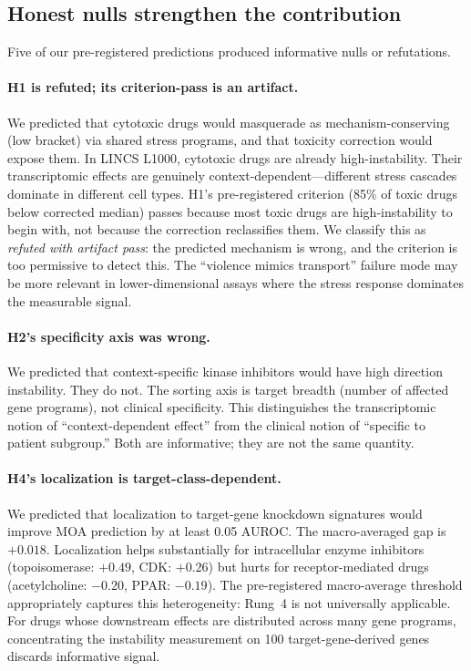 \documentclass{article}
\begin{document}
\subsection{Honest nulls strengthen the contribution}

Five of our pre-registered predictions produced informative nulls or refutations.

\paragraph{H1 is refuted; its criterion-pass is an artifact.}
We predicted that cytotoxic drugs would masquerade as mechanism-conserving
(low bracket) via shared stress programs, and that toxicity correction would
expose them. In LINCS L1000, cytotoxic drugs are already high-instability.
Their transcriptomic effects are genuinely context-dependent---different stress
cascades dominate in different cell types. H1's pre-registered criterion
(85\% of toxic drugs below corrected median) passes because most toxic drugs
are high-instability to begin with, not because the correction reclassifies
them. We classify this as \emph{refuted with artifact pass}: the predicted
mechanism is wrong, and the criterion is too permissive to detect this.
The ``violence mimics transport'' failure mode may be more relevant in
lower-dimensional assays where the stress response dominates the
measurable signal.

\paragraph{H2's specificity axis was wrong.}
We predicted that context-specific kinase inhibitors would have high direction
instability. They do not. The sorting axis is target breadth (number of
affected gene programs), not clinical specificity. This distinguishes the
transcriptomic notion of ``context-dependent effect'' from the clinical notion
of ``specific to patient subgroup.'' Both are informative; they are not the
same quantity.

\paragraph{H4's localization is target-class-dependent.}
We predicted that localization to target-gene knockdown signatures would
improve MOA prediction by at least 0.05 AUROC. The macro-averaged gap is
$+0.018$. Localization helps substantially for intracellular enzyme
inhibitors (topoisomerase: $+0.49$, CDK: $+0.26$) but hurts for
receptor-mediated drugs (acetylcholine: $-0.20$, PPAR: $-0.19$). The
pre-registered macro-average threshold appropriately captures this
heterogeneity: Rung~4 is not universally applicable. For drugs whose
downstream effects are distributed across many gene programs, concentrating
the instability measurement on 100 target-gene-derived genes discards
informative signal.
\end{document}
